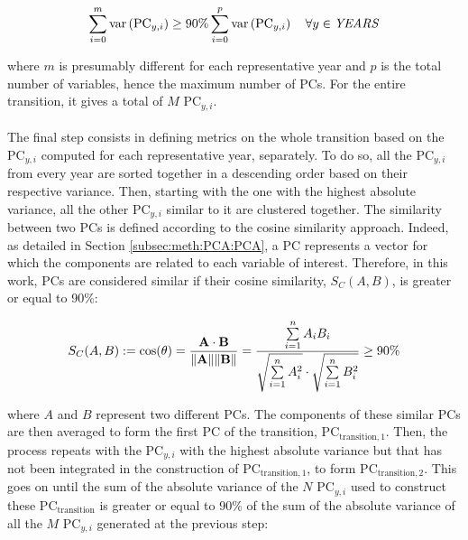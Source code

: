 \begin{equation}
\label{eq:PC_year}
\sum_{i=0}^m\text{var}\left(\text{PC}_{y,i}\right)\geq 90\% \sum_{i=0}^p\text{var}\left(\text{PC}_{y,i}\right) \quad \forall y \in \text{\emph{YEARS}}
\end{equation}

\noindent
where $m$ is presumably different for each representative year and $p$ is the total number of variables, hence the maximum number of PCs. For the entire transition, it gives a total of $M$ $\text{PC}_{y,i}$.\\

\\

\noindent
The final step consists in defining metrics on the whole transition based on the $\text{PC}_{y,i}$ computed for each representative year, separately. To do so, all the $\text{PC}_{y,i}$ from every year are sorted together in a descending order based on their respective variance. Then, starting with the one with the highest absolute variance, all the other $\text{PC}_{y,i}$ similar to it are clustered together. The similarity between two PCs is defined according to the cosine similarity approach. Indeed, as detailed in Section \ref{subsec:meth:PCA:PCA}, a PC represents a vector for which the components are related to each variable of interest. Therefore, in this work, PCs are considered similar if their cosine similarity, $S_C (A,B)$, is greater or equal to 90\%:

\begin{equation}
\label{eq:cos_similarity}
S_C (A,B):= \cos(\theta) = {\mathbf{A} \cdot \mathbf{B} \over \|\mathbf{A}\| \|\mathbf{B}\|} = \frac{ \sum\limits_{i=1}^{n}{A_i  B_i} }{ \sqrt{\sum\limits_{i=1}^{n}{A_i^2}} \cdot \sqrt{\sum\limits_{i=1}^{n}{B_i^2}} } \geq 90\%
\end{equation}

\noindent
where $A$ and $B$ represent two different PCs.  The components of these similar PCs are then averaged to form the first PC of the transition, $\text{PC}_{\text{transition},1}$. Then, the process repeats with the $\text{PC}_{y,i}$ with the highest absolute variance but that has not been integrated in the construction of $\text{PC}_{\text{transition},1}$, to form $\text{PC}_{\text{transition},2}$. This goes on until the sum of the absolute variance of the $N$ $\text{PC}_{y,i}$ used to construct these $\text{PC}_{\text{transition}}$ is greater or equal to 90\% of the sum of the absolute variance of all the $M$ $\text{PC}_{y,i}$ generated at the previous step:


